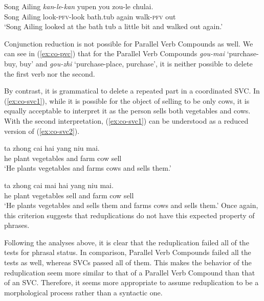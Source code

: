    \ex\label{ex:co-redup2}
   \gll Song Ailing \textit{kan}-\textit{le}-\textit{kan} yupen you zou-le chulai.\\
   Song Ailing look-\textsc{pfv}-look bath.tub again walk-\textsc{pfv} out\\  
   \glt `Song Ailing looked at the bath tub a little bit and walked out again.'
   \z
\z

Conjunction reduction is not possible for Parallel Verb Compounds as well.
We can see in (\ref{ex:co-pvc}) that for the Parallel Verb Compounds \textit{gou-mai} `purchase-buy, buy' and \textit{gou\hyp{}zhi} `purchase\hyp{}place, purchase', it is neither possible to delete the first verb nor the second.

\ea\label{ex:co-pvc}
    
    \z
\z

By contrast, it is grammatical to delete a repeated part in a coordinated {SVC}. 
In (\ref{ex:co-svc1}), while it is possible for the object of selling to be only cows, it is equally acceptable to interpret it as the person sells both vegetables and cows. With the second interpretation, (\ref{ex:co-svc1}) can be understood as a reduced version of (\ref{ex:co-svc2}).

\ea
  \ea\label{ex:co-svc1}
  \gll ta zhong cai hai yang niu mai.\\
  he plant vegetables and farm cow sell\\
  \glt `He plants vegetables and farms cows and sells them.'
  
  \ex\label{ex:co-svc2}
  \gll ta zhong cai mai hai yang niu mai.\\
  he plant vegetables sell and farm cow sell\\
  \glt `He plants vegetables and sells them and farms cows and sells them.'
   \z
\z
Once again, this criterion suggests that reduplications do not have this expected property of phrases.


Following the analyses above, it is clear that the reduplication failed all of the tests for phrasal status. 
In comparison, Parallel Verb Compounds failed all the tests as well, whereas {SVC}s passed all of them.
This makes the behavior of the reduplication seem more similar to that of a Parallel Verb Compound than that of an {SVC}.
Therefore, it seems more appropriate to assume reduplication to be a morphological process rather than a syntactic one. 




